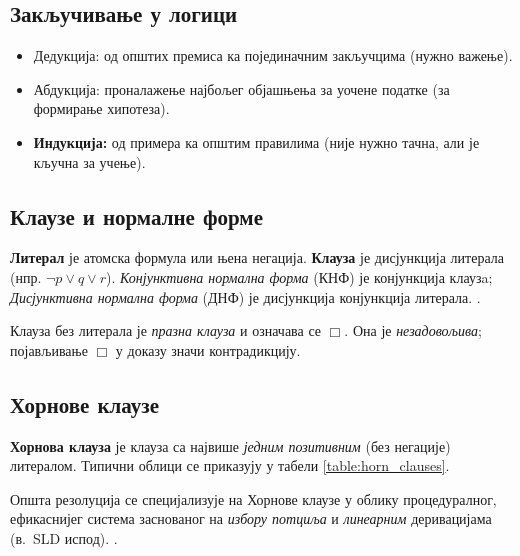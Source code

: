 \subsection{Закључивање у логици}
\begin{itemize}
  \item Дедукција: од општих премиса ка појединачним закључцима (нужно важење).
  \item Абдукција: проналажење најбољег објашњења за уочене податке (за формирање хипотеза). \cite{janii_2004_matematika}
  \item \textbf{Индукција:} од примера ка општим правилима (није нужно тачна, али је кључна за учење).
\end{itemize}

\subsection{Клаузе и нормалне форме}
\textbf{Литерал} је атомска формула или њена негација. \textbf{Клауза} је дисјункција литерала (нпр. $\neg p\lor q\lor r$). \emph{Конјунктивна нормална форма} (КНФ) је конјункција клаузa; \emph{Дисјунктивна нормална форма} (ДНФ) је дисјункција конјункција литерала. \cite{janii_2004_matematika}.

Клауза без литерала је \emph{празна клауза} и означава се $\Box$. Она је \emph{незадовољива}; појављивање $\Box$ у доказу значи контрадикцију.

\subsection{Хорнове клаузе}
\textbf{Хорнова клауза} је клауза са највише \emph{једним позитивним} (без негације) литералом. Типични облици се приказују у табели \ref{table:horn_clauses}.
\begin{table}[H]
\centering
{}
\caption{Облици Хорнових клауза.}
\label{table:horn_clauses}
\end{table}
\noindent Општа резолуција се специјализује на Хорнове клаузе у облику процедуралног, ефикаснијег система заснованог на \emph{избору потциља} и \emph{линеарним} деривацијама (в.\ SLD испод). \cite{janii_2004_matematika}.


